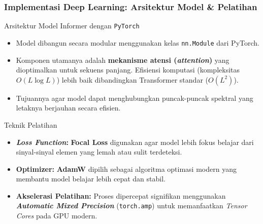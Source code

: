 \documentclass{beamer}
\begin{document}
\begin{frame}
  \frametitle{Implementasi Deep Learning: Arsitektur Model \& Pelatihan}
  
  \begin{block}{Arsitektur Model Informer dengan \texttt{PyTorch}}
    \begin{itemize}
        \item Model dibangun secara modular menggunakan kelas \texttt{nn.Module} dari PyTorch.
        \item Komponen utamanya adalah \textbf{mekanisme atensi (\textit{attention})} yang dioptimalkan untuk sekuens panjang. Efisiensi komputasi (kompleksitas $O(L \log L)$) lebih baik dibandingkan Transformer standar ($O(L^2)$).
        \item Tujuannya agar model dapat menghubungkan puncak-puncak spektral yang letaknya berjauhan secara efisien.
    \end{itemize}
  \end{block}

  \begin{block}{Teknik Pelatihan}
    \begin{itemize}
      \item \textbf{\textit{Loss Function}:} \textbf{Focal Loss} digunakan agar model lebih fokus belajar dari sinyal-sinyal elemen yang lemah atau sulit terdeteksi.
      \item \textbf{Optimizer:} \textbf{AdamW} dipilih sebagai algoritma optimasi modern yang membantu model belajar lebih cepat dan stabil.
      \item \textbf{Akselerasi Pelatihan:} Proses dipercepat signifikan menggunakan \textbf{\textit{Automatic Mixed Precision}} (\texttt{torch.amp}) untuk memanfaatkan \textit{Tensor Cores} pada GPU modern.
    \end{itemize}
  \end{block}
\end{frame}
\end{document}
